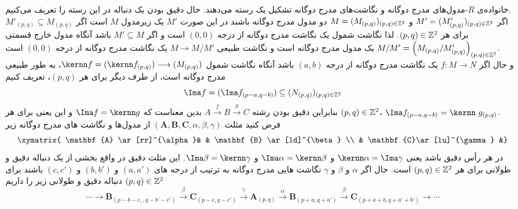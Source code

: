 \begin{nok-def}
خانواده‌ی $R$-مدول‌های مدرج دوگانه و نگاشت‌های مدرج دوگانه تشکیل یک رسته می‌دهند.
حال دقیق بودن یک دنباله در این رسته را تعریف می‌کنیم.\\
اگر $M'=(M'_{(p,q)})_{(p,q)\in \Bbb Z^2}$ و $M=(M_{(p,q)})_{(p,q)\in \Bbb Z^2}$ دو مدول مدرج دوگانه باشند در این صورت $M'$ یک
زیرمدول $M$ است اگر $M'_{(p,q)}\subseteq M_{(p,q)}$ برای هر $(p,q)\in\Bbb Z^2$.
لذا نگاشت شمول یک نگاشت مدرج دوگانه از درجه $(0,0)$ است و اگر $M'\subseteq M$ باشد آنگاه
مدول خارج قسمتی
\linebreak
$M/M'=\left(M_{(p,q)}/M'_{(p,q)}\right)_{(p,q)\in\Bbb Z^2}$ یک مدول مدرج دوگانه است
و نگاشت طبیعی $M\longrightarrow M/M'$ یک نگاشت مدرج دوگانه از درجه $(0,0)$ است.\\
و حال اگر $f:M\longrightarrow N$ یک نگاشت مدرج دوگانه از درجه $(a,b)$ باشد آنگاه نگاشت شمول $\kernn f=(\kernn f_{(p,q)})\longrightarrow (M_{(p,q)})$، به طور طبیعی مدرج دوگانه است،
از طرف دیگر برای هر $(p,q)$، تعریف کنیم
$$\Ima f=(\Ima f_{(p-a,q-b)})\subseteq (N_{(p,q)})_{(p,q)\in\Bbb Z^2}$$
بنابراین دقیق بودن رشته $A\xrightarrow{f}B\xrightarrow{g} C$ بدین معناست که $\Ima f=\kernn g$ و این یعنی برای هر $(p,q)\in\Bbb Z^2$،
$\Ima f_{(p-a,q-b)}=\kernn~g_{(p,q)}$.\\
فرض کنید مثلث $(\mathbf{A},\mathbf{B},\mathbf{C},\alpha,\beta,\gamma)$ از مدول‌‌ها و نگاشت های مدرج دوگانه زیر
\begin{displaymath}
\xymatrix{
\mathbf{A} \ar[rr]^{\alpha}& &
\mathbf{B} \ar[ld]^{\beta} \\
& \mathbf{C}\ar[lu]^{\gamma} &}
\end{displaymath}
در هر رأس دقیق باشد یعنی $\kernn \alpha=\Ima \gamma$ و $\Ima \alpha=\kernn \beta$ و $\Ima \beta=\kernn \gamma$.
این مثلث دقیق در واقع بخشی از یک دنباله دقیق و طولانی برای هر $(p,q)\in\Bbb Z^2$ است. حال اگر $\alpha$ و $\beta$ و $\gamma$ نگاشت هایی مدرج دوگانه به ترتیب از درجه های $(a,a')$ و $(b,b')$ و $(c,c')$ باشند برای
$(p,q)\in\Bbb Z^2$
دنباله دقیق و طولانی زیر را داریم
$$\cdots\longrightarrow\mathbf{B}_{(p-b-c,,q-b'-c')}\xrightarrow{\beta}\mathbf{C}_{(p-c,q-c')}\xrightarrow{\gamma} \mathbf{A}_{(p,q)}\xrightarrow{\alpha}\mathbf{B}_{(p+a,q+a')}\xrightarrow{\beta}\mathbf{C}_{(p+a+b,q+a'+b')}\rightarrow\cdots$$
\end{nok-def}
